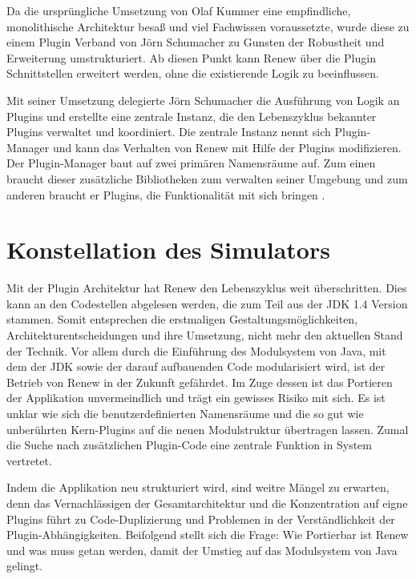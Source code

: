 Da die ursprüngliche Umsetzung von Olaf Kummer eine empfindliche, monolithische Architektur besaß und viel Fachwissen voraussetzte, wurde diese zu einem Plugin Verband von Jörn Schumacher zu Gunsten der Robustheit und Erweiterung umstrukturiert\cite{schummacher}. Ab diesen Punkt kann Renew über die Plugin Schnittstellen erweitert werden, ohne die existierende Logik zu beeinflussen.\bigbreak

Mit seiner Umsetzung delegierte Jörn Schumacher die Ausführung von Logik an Plugins und erstellte eine zentrale Instanz, die den Lebenszyklus bekannter Plugins verwaltet und koordiniert. Die zentrale Instanz nennt sich Plugin-Manager und kann das Verhalten von Renew mit Hilfe der Plugins modifizieren. Der Plugin-Manager baut auf zwei primären Namensräume auf. Zum einen braucht dieser zusätzliche Bibliotheken zum verwalten seiner Umgebung und zum anderen braucht er Plugins, die Funktionalität mit sich bringen \cite{douvigneau}.

\section{Konstellation des Simulators} \label{sec:KdS}

Mit der Plugin Architektur hat Renew den Lebenszyklus weit überschritten. Dies kann an den Codestellen abgelesen werden, die zum Teil aus der JDK 1.4 Version stammen. Somit entsprechen die erstmaligen Gestaltungsmöglichkeiten, Architekturentscheidungen und ihre Umsetzung, nicht mehr den aktuellen Stand der Technik. Vor allem durch die Einführung des Modulsystem von Java, mit dem der JDK sowie der darauf aufbauenden Code modularisiert wird, ist der Betrieb von Renew in der Zukunft gefährdet. Im Zuge dessen ist das Portieren der Applikation unvermeindlich und trägt ein gewisses Risiko mit sich. Es ist unklar wie sich die benutzerdefinierten Namensräume und die so gut wie unberührten Kern-Plugins auf die neuen Modulstruktur übertragen lassen. Zumal die Suche nach zusätzlichen Plugin-Code eine zentrale Funktion in System vertretet.\bigbreak

Indem die Applikation neu strukturiert wird, sind weitre Mängel zu erwarten, denn das Vernachlässigen der Gesamtarchitektur und die Konzentration auf eigne Plugins führt zu Code-Duplizierung und Problemen in der Verständlichkeit der Plugin-Abhängigkeiten.\newline
Beifolgend stellt sich die Frage: Wie Portierbar ist Renew und was muss getan werden, damit der Umstieg auf das Modulsystem von Java gelingt.

